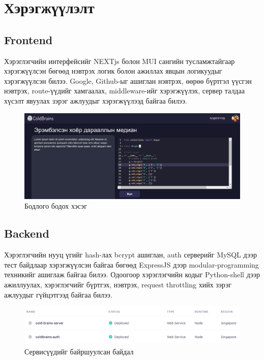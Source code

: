 \chapter{Хэрэгжүүлэлт}
\section{Frontend}
Хэрэглэгчийн интерфейсийг NEXTjs болон MUI сангийн тусламжтайгаар хэрэгжүүлсэн бөгөөд нэвтрэх логик болон ажиллах явцын логикуудыг хэрэгжүүлсэн билээ. Google, Github-ыг ашиглан нэвтрэх, өөрөө бүртгэл үүсгэн нэвтрэх, route-үүдийг хамгаалах, middleware-ийг хэрэгжүүлэх, сервер талдаа хүсэлт явуулах зэрэг ажлуудыг хэрэгжүүлээд байгаа билээ. 

\begin{figure}[h]
  \centering
  \includegraphics[width=16cm]{img/coldbrains-problem.PNG}
  \caption{Бодлого бодох хэсэг}
\end{figure}

\clearpage

\section{Backend}
Хэрэглэгчийн нууц үгийг hash-лах bcrypt ашиглан, auth серверийг MySQL дээр тест байдлаар хэрэгжүүлсэн байгаа бөгөөд ExpressJS дээр modular-programming техникийг ашиглаж байгаа билээ. Одоогоор хэрэглэгчийн кодыг Python-shell дээр ажиллуулах, хэрэглэгчийг бүртгэх, нэвтрэх, request throttling хийх зэрэг ажлуудыг гүйцэтгээд байгаа билээ.

\begin{figure}[h]
  \centering
  \includegraphics[width=16cm]{img/render.com.png}
  \caption{Сервисүүдийг байршуулсан байдал}
\end{figure}